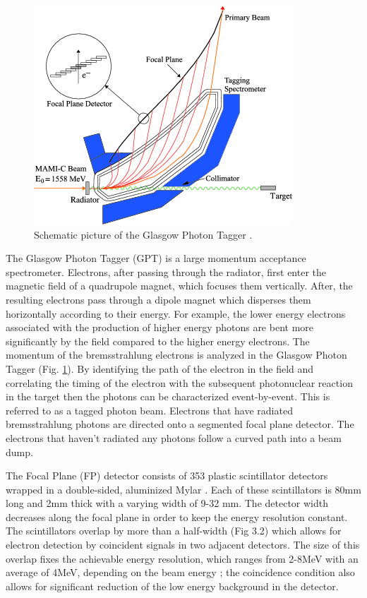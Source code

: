 \begin{figure}[H]
\begin{center}
\includegraphics[scale=0.8]{pictures/png/GlaTagger.png}
\caption{Schematic picture of the Glasgow Photon Tagger \cite{marcu}.}
\label{gpt}
\end{center}
\end{figure}

\indent The Glasgow Photon Tagger (GPT) is a large momentum acceptance spectrometer. Electrons, after passing through the radiator, first enter the magnetic field of a quadrupole magnet, which focuses them vertically. After, the resulting electrons pass through a dipole magnet which disperses them horizontally according to their energy. For example, the lower energy electrons associated with the production of higher energy photons are bent more significantly by the field compared to the higher energy electrons. The momentum of the bremsstrahlung electrons is analyzed in the Glasgow Photon Tagger (Fig. \ref{gpt}). By identifying the path of the electron in the field and correlating the timing of the electron with the subsequent photonuclear reaction in the target then the photons can be characterized event-by-event. This is referred to as a tagged photon beam. Electrons that have radiated bremsstrahlung photons are directed onto a segmented focal plane detector. The electrons that haven't radiated any photons follow a curved path into a beam dump.

\indent The Focal Plane (FP) detector consists of 353 plastic scintillator detectors wrapped in a double-sided, aluminized Mylar \cite{sjhall}. Each of these scintillators is 80mm long and 2mm thick with a varying width of 9-32 mm. The detector width decreases along the focal plane in order to keep the energy resolution constant. The scintillators overlap by more than a half-width (Fig 3.2) which allows for electron detection by coincident signals in two adjacent detectors. The size of this overlap fixes the achievable energy resolution, which ranges from 2-8MeV with an average of 4MeV, depending on the beam energy \cite{mcgeorge}; the coincidence condition also allows for significant reduction of the low energy background in the detector.

